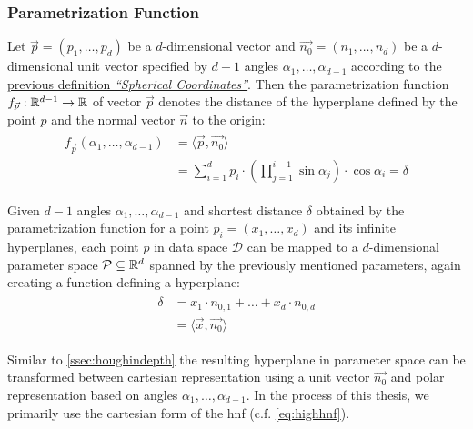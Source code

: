 \subsubsection*{Parametrization Function}
Let $\vec{p} = (p_1,\dotsc,p_d)$ be a $d$-dimensional vector and $\vec{n_0} = (n_1,\dotsc,n_d)$ be a $d$-dimensional unit vector specified by $d-1$ angles $\alpha_1,\dotsc,\alpha_{d-1}$ according to the \hyperref[def:spherecord]{previous definition \textit{``Spherical Coordinates''}}. Then the parametrization function $f_{\vec{p}}:\mathbb{R}^{d-1} \rightarrow \mathbb{R}$ of vector $\vec{p}$ denotes the distance of the hyperplane defined by the point $p$ and the normal vector $\vec{n}$ to the origin:
\begin{align}
    \begin{split}
            f_{\vec{p}}(\alpha_1,\dotsc,\alpha_{d-1}) &= \langle \vec{p},\vec{n_0} \rangle\\
    &= \sum_{i=1}^d p_i \cdot (\prod_{j=1}^{i-1} \sin{\alpha_j}) \cdot \cos{\alpha_i}  = \delta
    \end{split}
\end{align}

Given $d-1$ angles $\alpha_1,\dotsc,\alpha_{d-1}$ and shortest distance $\delta$ obtained by the parametrization function for a point $p_i = (x_1,\dotsc,x_d)$ and its infinite hyperplanes, each point $p$ in data space $\mathcal{D}$ can be mapped to a $d$-dimensional parameter space $\mathcal{P} \subseteq \mathbb{R}^d$ spanned by the previously mentioned parameters, again creating a function defining a hyperplane:
\begin{align}
    \begin{split}
        \delta &= x_1 \cdot n_{0,1} + \dots + x_d \cdot n_{0,d}\\
        &= \langle \vec{x},\vec{n_0} \rangle\label{eq:highhnf}
    \end{split}
\end{align}

Similar to \autoref{ssec:houghindepth} the resulting hyperplane in parameter space can be transformed between  cartesian representation using a unit vector $\vec{n_0}$ and polar representation based on angles $\alpha_1,\dotsc,\alpha_{d-1}$. In the process of this thesis, we primarily use the cartesian form of the \gls{hnf} (c.f. \autoref{eq:highhnf}).


